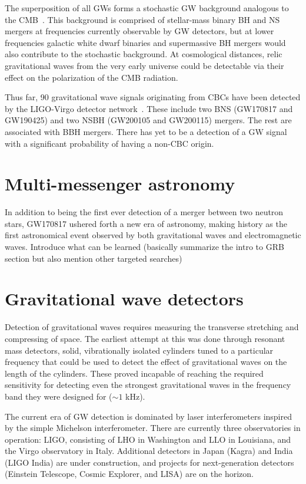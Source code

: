 The superposition of all \acp{GW} forms a stochastic \ac{GW} background analogous to the \ac{CMB}~\citep{Christensen_2018}.
This background is comprised of stellar-mass binary \ac{BH} and \ac{NS} mergers at frequencies currently observable by \ac{GW} detectors, but at lower frequencies galactic white dwarf binaries and supermassive BH mergers would also contribute to the stochastic background.
At cosmological distances, relic gravitational waves from the very early universe could be detectable via their effect on the polarization of the \ac{CMB} radiation.

Thus far, 90 gravitational wave signals originating from \acp{CBC} have been detected by the LIGO-Virgo detector network~\citep{gwtc3}. These include two \ac{BNS} (GW170817 and GW190425) and two \ac{NSBH} (GW200105 and GW200115) mergers. The rest are associated with \ac{BBH} mergers. There has yet to be a detection of a \ac{GW} signal with a significant probability of having a non-\ac{CBC} origin.


\section{Multi-messenger astronomy}

In addition to being the first ever detection of a merger between two neutron stars, GW170817 ushered forth a new era of astronomy, making history as the first astronomical event observed by both gravitational waves and electromagnetic waves.
{\color{red}Introduce what can be learned (basically summarize the intro to GRB section but also mention other targeted searches)}


\section{Gravitational wave detectors}\label{sec:gw-detectors}

Detection of gravitational waves requires measuring the transverse stretching and compressing of space. The earliest attempt at this was done through resonant mass detectors, solid, vibrationally isolated cylinders tuned to a particular frequency that could be used to detect the effect of gravitational waves on the length of the cylinders. These proved incapable of reaching the required sensitivity for detecting even the strongest gravitational waves in the frequency band they were designed for ($\sim1$ kHz).

The current era of \ac{GW} detection is dominated by laser interferometers inspired by the simple Michelson interferometer. There are currently three observatories in operation: \ac{LIGO}, consisting of \ac{LHO} in Washington and \ac{LLO} in Louisiana, and the Virgo observatory in Italy. Additional detectors in Japan (Kagra) and India (\ac{LIGO} India) are under construction, and projects for next-generation detectors (Einstein Telescope, Cosmic Explorer, and \ac{LISA}) are on the horizon.

